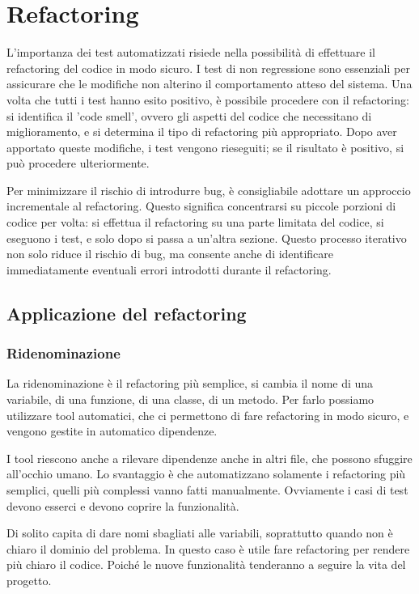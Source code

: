 \section{Refactoring}
L'importanza dei test automatizzati risiede nella possibilità di
effettuare il refactoring del codice in modo sicuro. I test di non
regressione sono essenziali per assicurare che le modifiche non alterino
il comportamento atteso del sistema. Una volta che tutti i test hanno
esito positivo, è possibile procedere con il refactoring: si identifica
il 'code smell', ovvero gli aspetti del codice che necessitano di
miglioramento, e si determina il tipo di refactoring più appropriato.
Dopo aver apportato queste modifiche, i test vengono rieseguiti; se il
risultato è positivo, si può procedere ulteriormente.

Per minimizzare il rischio di introdurre bug, è consigliabile adottare un
approccio incrementale al refactoring. Questo significa concentrarsi su
piccole porzioni di codice per volta: si effettua il refactoring su una
parte limitata del codice, si eseguono i test, e solo dopo si passa a
un'altra sezione. Questo processo iterativo non solo riduce il rischio
di bug, ma consente anche di identificare immediatamente eventuali errori
introdotti durante il refactoring.

\subsection{Applicazione del refactoring}
\subsubsection{Ridenominazione}
La ridenominazione è il refactoring più semplice, si cambia il nome
di una variabile, di una funzione, di una classe, di un metodo. Per farlo possiamo 
utilizzare tool automatici, che ci permettono di fare refactoring
in modo sicuro, e vengono gestite in automatico dipendenze.

I tool riescono anche a rilevare dipendenze anche in altri file,
che possono sfuggire all'occhio umano. Lo svantaggio è che automatizzano 
solamente i refactoring più semplici, quelli più complessi vanno fatti
manualmente. Ovviamente i casi di test devono esserci e devono coprire 
la funzionalità.

Di solito capita di dare nomi sbagliati alle variabili, soprattutto 
quando non è chiaro il dominio del problema. In questo caso è utile
fare refactoring per rendere più chiaro il codice. Poiché le nuove funzionalità 
tenderanno a seguire la vita del progetto.

